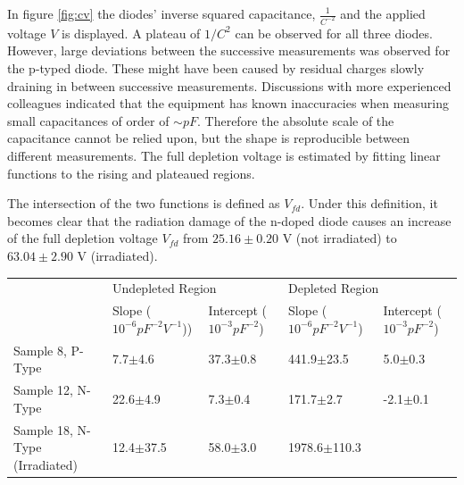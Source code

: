 \documentclass[11pt]{report}
\begin{document}
In figure \ref{fig:cv} the diodes' inverse squared capacitance, $\frac{1}{C^{-2}}$ and the applied voltage $V$ is displayed.
A plateau of $1/C^2$ can be observed for all three diodes.
However, large deviations between the successive measurements was observed for the p-typed diode. These might have been caused by residual charges slowly draining in between successive measurements.
Discussions with more experienced colleagues indicated that the equipment has known inaccuracies when measuring small capacitances of order of $\sim pF$. Therefore the absolute scale of the capacitance cannot be relied upon, but the shape is reproducible between different measurements.
The full depletion voltage is estimated by fitting linear functions to the rising and plateaued regions. 

The intersection of the two functions is defined as $V_{fd}$.
Under this definition, it becomes clear that the radiation damage of the n-doped diode causes an increase of the full depletion voltage $V_{fd}$ from $25.16\pm0.20$ V (not irradiated) to $63.04\pm2.90$ V (irradiated).


\begin{table}[]
\centering
\begin{tabular}{lllll}
                               & \multicolumn{2}{l}{Undepleted Region}                                                                                               & \multicolumn{2}{l}{Depleted Region}                                                                                                \\
                               & Slope ($10^{-6}pF^{-2}V^{-1}$)) & Intercept ($10^{-3}pF^{-2}$) & Slope ($10^{-6}pF^{-2}V^{-1}$) & Intercept ($10^{-3}pF^{-2}$) \\
Sample 8, P-Type               & 7.7$\pm$4.6                                                                 & 37.3$\pm$0.8                                              & 441.9$\pm$23.5                                                             & 5.0$\pm$0.3                                               \\
Sample 12, N-Type              & 22.6$\pm$4.9                                                                & 7.3$\pm$0.4                                               & 171.7$\pm$2.7                                                              & -2.1$\pm$0.1                                              \\
Sample 18, N-Type (Irradiated) & 12.4$\pm$37.5                                                               & 58.0$\pm$3.0                                              & 1978.6$\pm$110.3                                                           &                                                        
\end{tabular}
\end{table}
\end{document}
